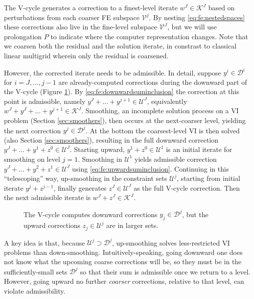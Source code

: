 \documentclass[letterpaper,final,12pt,reqno]{amsart}
\theoremstyle{cstyle}
\theoremstyle{cstyle*}
\theoremstyle{dstyle}
\numberwithin{equation}{section}
\numberwithin{figure}{section}
\numberwithin{table}{section}
\numberwithin{theorem}{section}
\newcommand{\fascd}{\pr{fascd}\xspace}
\begin{document}
The V-cycle generates a correction to a finest-level iterate $w^J \in \mathcal{K}^J$ based on perturbations from each coarser FE subspace $\mathcal{V}^j$.  By nesting \eqref{eq:fe:nestedspaces} these corrections also live in the fine-level subspace $\mathcal{V}^J$, but we will use prolongation $P$ to indicate where the computer representation changes.  Note that we coarsen both the residual and the solution iterate, in constrast to classical linear multigrid wherein only the residual is coarsened.

However, the corrected iterate needs to be admissible.  In detail, suppose $y^i \in \mathcal{D}^i$ for $i=J,\dots,j-1$ are already-computed corrections during the downward part of the V-cycle (Figure \ref{fig:fascdvcycle}).  By \eqref{eq:fe:downwardsuminclusion} the correction at this point is admissible, namely $y^J + \dots + y^{j+1} \in \mathcal{U}^J$, equivalently $w^J + y^J + \dots + y^{j+1} \in \mathcal{K}^J$.  Smoothing, an incomplete solution process on a VI problem (Section \ref{sec:smoothers}), then occurs at the next-coarser level, yielding the next correction $y^j \in \mathcal{D}^j$.  At the bottom the coarsest-level VI is then solved (also Section \ref{sec:smoothers}), resulting in the full downward correction $y^J + \dots + y^1 + z^0 \in \mathcal{U}^J$.  Starting upward, $y^1 + z^0 \in \mathcal{U}^1$ is an initial iterate for smoothing on level $j=1$.  Smoothing in $\mathcal{U}^1$ yields admissible correction $y^J + \dots + y^2 + z^1 \in \mathcal{U}^J$ using \eqref{eq:fe:upwardsuminclusion}.  Continuing in this ``telescoping'' way, up-smoothing in the constraint sets $\mathcal{U}^j$, starting from initial iterate $y^j+z^{j-1}$, finally generates $z^J\in \mathcal{U}^J$ as the full V-cycle correction.  Then the next admissible iterate is $w^J + z^J \in \mathcal{K}^J$.

\begin{figure}[ht]
\begin{center}

\end{center}
\caption{The \fascd V-cycle computes downward corrections $y_j \in \mathcal{D}^j$, but the upward corrections $z_j\in\mathcal{U}^j$ are in larger sets.}
\label{fig:fascdvcycle}
\end{figure}

A key idea is that, because $\mathcal{U}^j\supset \mathcal{D}^j$, up-smoothing solves less-restricted VI problems than down-smoothing.  Intuitively-speaking, going downward one does not know what the upcoming coarse corrections will be, so they must be in the sufficiently-small sets $\mathcal{D}^j$ so that their sum is admissible once we return to a level.  However, going upward no further \emph{coarser} corrections, relative to that level, can violate admissibility.
\end{document}
